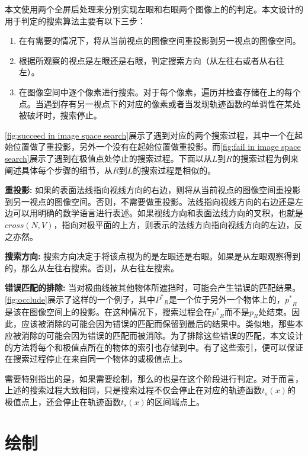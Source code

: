 {本文使用两个全屏后处理来分别实现左眼和右眼两个图像上的\epsl{}的判定。本文设计的用于\epsl{}判定的搜索算法主要有以下三步：

\begin{enumerate}
    \item 在有需要的情况下，将\conp{}从当前视点的图像空间重投影到另一视点的图像空间。
    \item 根据\conp{}所观察的视点是左眼还是右眼，判定搜索方向（从左往右或者从右往左）。
    \item 在图像空间中逐个像素进行搜索。对于每个像素，遍历并检查存储在\ppll{}上的每个点。当遇到存有另一视点下的对应\conp{}的像素或者当发现轨迹函数的单调性在某处被破坏时，搜索停止。
\end{enumerate}

\autoref{fig:succeed in image space search}展示了遇到对应\conp{}的两个搜索过程，其中一个在起始位置做了重投影，另外一个没有在起始位置做重投影。而\autoref{fig:fail in image space search}展示了遇到在极值点处停止的搜索过程。下面以从$L$到$R$的搜索过程为例来阐述具体每个步骤的细节，从$R$到$L$的搜索过程是相似的。

{\textbf{重投影:} 如果\conp{}的表面法线指向视线方向的右边，则将\conp{}从当前视点的图像空间重投影到另一视点的图像空间。否则，不需要做重投影。法线指向视线方向的右边还是左边可以用明确的数学语言进行表述。如果视线方向和表面法线方向的叉积，也就是$cross(N, V)$，指向对极平面的上方，则表示\conp{}的法线方向指向视线方向的左边，反之亦然。

\textbf{搜索方向:} 搜索方向决定于将该点视为\conp{}的是左眼还是右眼。如果\conp{}是从左眼观察得到的，那么从左往右搜索。否则，从右往左搜索。

\textbf{错误匹配的排除:} 当对极曲线被其他物体所遮挡时，可能会产生错误的匹配结果。\autoref{fig:occlude}展示了这样的一个例子，其中${P^*}_R$是一个位于另外一个物体上的\conp{}，${p^*}_R$是该\conp{}在图像空间上的投影。在这种情况下，搜索过程会在${p^*}_R$而不是$p_R$处结束。因此，应该被消除的\conp{}可能会因为错误的匹配而保留到最后的结果中。类似地，那些本应被消除的\conp{}可能会因为错误的匹配而被消除。为了排除这些错误的匹配，本文设计的方法将每个\conp{}和极值点所在的物体的索引也存储到\ppll{}中。有了这些索引，便可以保证在搜索过程停止在来自同一个物体的\conp{}或极值点上。

需要特别指出的是，如果需要绘制\scon{}，那么\scon{}的\epsl{}也是在这个阶段进行判定。对于\scon{}而言，上述的搜索过程大致相同，只是搜索过程不仅会停止在对应的轨迹函数$t_s(x)$的极值点上，还会停止在轨迹函数$t_s(x)$的区间端点上。

\section{绘制\stc{}\con{}}

}}
